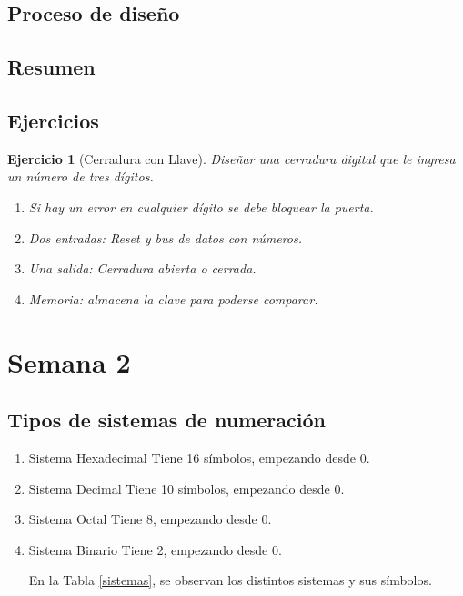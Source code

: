 \documentclass[12pt,letterpaper]{book}
\newtheorem{exercise}{Ejercicio}
\begin{document}
\section{Proceso de diseño}


\section{Resumen} 
\section{Ejercicios} 

\begin{exercise}[Cerradura con Llave]

Diseñar una cerradura digital que le ingresa un número de tres dígitos.

\begin{enumerate}
\item Si hay un error en cualquier dígito se debe bloquear la puerta.
\item Dos entradas: Reset y bus de datos con números.
\item Una salida: Cerradura abierta o cerrada.
\item Memoria: almacena la clave para poderse comparar.

\end{enumerate} 


\end{exercise}

\chapter{Semana 2}

\section{Tipos de sistemas de numeración}
\begin{enumerate}
\item Sistema Hexadecimal
Tiene 16  símbolos, empezando desde 0.
\item Sistema Decimal
Tiene 10 símbolos, empezando desde 0.
\item Sistema Octal
Tiene 8, empezando desde 0.
\item Sistema Binario
Tiene 2, empezando desde 0.

En la Tabla \ref{sistemas}, se observan los distintos sistemas y sus símbolos.
\end{enumerate}
\end{document}
